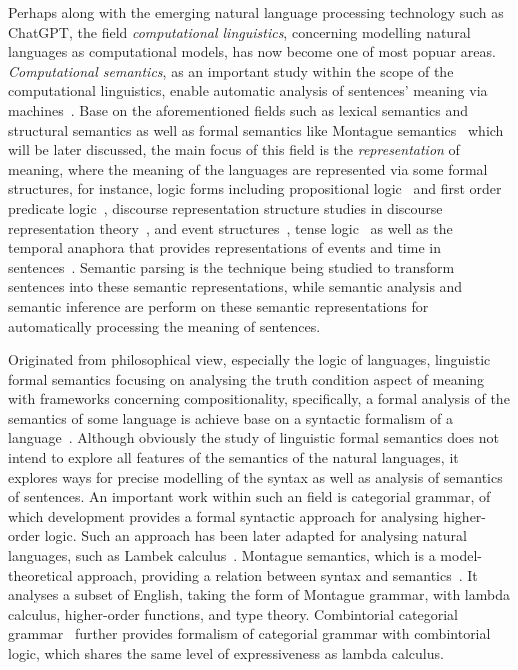 Perhaps along with the emerging natural language processing technology such as ChatGPT, the field \emph{computational linguistics}, concerning modelling natural languages as computational models, has now become one of most popuar areas. \emph{Computational semantics}, as an important study within the scope of the computational linguistics, enable automatic analysis of sentences' meaning via machines~\citep{mitkov2022}. Base on the aforementioned fields such as lexical semantics and structural semantics as well as formal semantics like Montague semantics~\citep{Montague1970-MONEAA-2} which will be later discussed, the main focus of this field is the \emph{representation} of meaning, where the meaning of the languages are represented via some formal structures, for instance, logic forms including propositional logic~\citep{boole1854investigation} and first order predicate logic~\citep{Frege1879-FREBAF-2}, discourse representation structure studies in discourse representation theory~\citep{Kamp1993-KAMFDT}, and event structures~\citep{PUSTEJOVSKY199147}, tense logic~\citep{Prior1955-PRITAM, Kamp1968-KAMTLA} as well as the temporal anaphora that provides representations of events and time in sentences~\citep{partee1884, hinrichs1986}. Semantic parsing is the technique being studied to transform sentences into these semantic representations, while semantic analysis and semantic inference are perform on these semantic representations for automatically processing the meaning of sentences. 

Originated from philosophical view, especially the logic of languages, linguistic formal semantics focusing on analysing the truth condition aspect of meaning with frameworks concerning compositionality, specifically, a formal analysis of the semantics of some language is achieve base on a syntactic formalism of a language~\citep{alma999704883502466}. Although obviously the study of linguistic formal semantics does not intend to explore all features of the semantics of the natural languages, it explores ways for precise modelling of the syntax as well as analysis of semantics of sentences. An important work within such an field is categorial grammar, of which  development provides a formal syntactic approach for analysing higher-order logic. Such an approach has been later adapted for analysing natural languages, such as Lambek calculus~\citep{Lambek1958-LAMTMO-5}. Montague semantics, which is a model-theoretical approach, providing a relation between syntax and semantics~\citep{Montague1970-MONEAA-2}. It analyses a subset of English, taking the form of Montague grammar, with lambda calculus, higher-order functions, and type theory. Combintorial categorial grammar~\citep{steedman2001, steedman2011combinatory} further provides formalism of categorial grammar with combintorial logic, which shares the same level of expressiveness as lambda calculus.
\begin{center}
\vspace{-0.7em}
\vspace{-0.3em}
\end{center}

